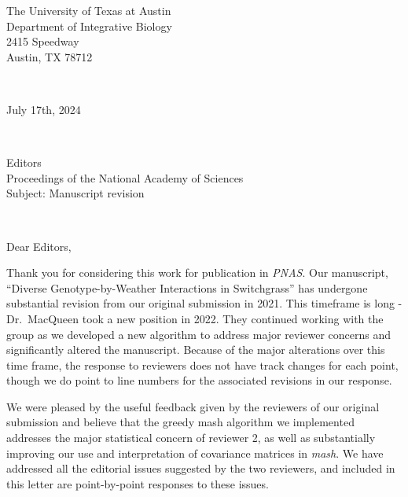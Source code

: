 \documentclass[
  letterpaper,
  DIV=11,
  numbers=noendperiod]{scrartcl}
\author{}
\date{}
\begin{document}
\begin{flushright}
The University of Texas at Austin\\
Department of Integrative Biology\\
2415 Speedway\\
Austin, TX 78712

\end{flushright}

~

\begin{flushright}
July 17th, 2024

\end{flushright}

~

\begin{flushleft}
Editors\\
Proceedings of the National Academy of Sciences\\

Subject: Manuscript revision

\end{flushleft}

~

Dear Editors,

Thank you for considering this work for publication in \emph{PNAS}. Our
manuscript, ``Diverse Genotype-by-Weather Interactions in Switchgrass''
has undergone substantial revision from our original submission in 2021.
This timeframe is long - Dr.~MacQueen took a new position in 2022. They
continued working with the group as we developed a new algorithm to
address major reviewer concerns and significantly altered the
manuscript. Because of the major alterations over this time frame, the
response to reviewers does not have track changes for each point, though
we do point to line numbers for the associated revisions in our
response.

We were pleased by the useful feedback given by the reviewers of our
original submission and believe that the greedy mash algorithm we
implemented addresses the major statistical concern of reviewer 2, as
well as substantially improving our use and interpretation of covariance
matrices in \emph{mash}. We have addressed all the editorial issues
suggested by the two reviewers, and included in this letter are
point-by-point responses to these issues.
\end{document}
